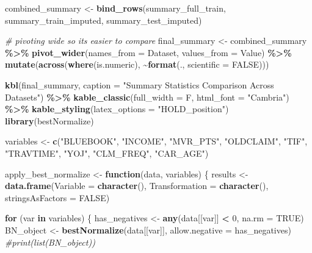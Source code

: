 \documentclass[
]{article}
\newenvironment{Shaded}{\begin{snugshade}}{\end{snugshade}}
\newcommand{\AttributeTok}[1]{\textcolor[rgb]{0.13,0.29,0.53}{#1}}
\newcommand{\CommentTok}[1]{\textcolor[rgb]{0.56,0.35,0.01}{\textit{#1}}}
\newcommand{\ConstantTok}[1]{\textcolor[rgb]{0.56,0.35,0.01}{#1}}
\newcommand{\ControlFlowTok}[1]{\textcolor[rgb]{0.13,0.29,0.53}{\textbf{#1}}}
\newcommand{\DecValTok}[1]{\textcolor[rgb]{0.00,0.00,0.81}{#1}}
\newcommand{\FunctionTok}[1]{\textcolor[rgb]{0.13,0.29,0.53}{\textbf{#1}}}
\newcommand{\NormalTok}[1]{#1}
\newcommand{\OtherTok}[1]{\textcolor[rgb]{0.56,0.35,0.01}{#1}}
\newcommand{\SpecialCharTok}[1]{\textcolor[rgb]{0.81,0.36,0.00}{\textbf{#1}}}
\newcommand{\StringTok}[1]{\textcolor[rgb]{0.31,0.60,0.02}{#1}}
\begin{document}
\begin{Shaded}
\begin{Highlighting}[]
\NormalTok{combined\_summary }\OtherTok{\textless{}{-}} \FunctionTok{bind\_rows}\NormalTok{(summary\_full\_train, summary\_train\_imputed, summary\_test\_imputed)}

\CommentTok{\# pivoting wide so it\textquotesingle{}s easier to compare}
\NormalTok{final\_summary }\OtherTok{\textless{}{-}}\NormalTok{ combined\_summary }\SpecialCharTok{\%\textgreater{}\%}
    \FunctionTok{pivot\_wider}\NormalTok{(}\AttributeTok{names\_from =}\NormalTok{ Dataset, }\AttributeTok{values\_from =}\NormalTok{ Value) }\SpecialCharTok{\%\textgreater{}\%} 
    \FunctionTok{mutate}\NormalTok{(}\FunctionTok{across}\NormalTok{(}\FunctionTok{where}\NormalTok{(is.numeric), }\SpecialCharTok{\textasciitilde{}}\FunctionTok{format}\NormalTok{(., }\AttributeTok{scientific =} \ConstantTok{FALSE}\NormalTok{)))}

\FunctionTok{kbl}\NormalTok{(final\_summary, }\AttributeTok{caption =} \StringTok{"Summary Statistics Comparison Across Datasets"}\NormalTok{) }\SpecialCharTok{\%\textgreater{}\%}
  \FunctionTok{kable\_classic}\NormalTok{(}\AttributeTok{full\_width =}\NormalTok{ F, }\AttributeTok{html\_font =} \StringTok{"Cambria"}\NormalTok{) }\SpecialCharTok{\%\textgreater{}\%}
  \FunctionTok{kable\_styling}\NormalTok{(}\AttributeTok{latex\_options =} \StringTok{"HOLD\_position"}\NormalTok{)}
\FunctionTok{library}\NormalTok{(bestNormalize)}

\NormalTok{variables }\OtherTok{\textless{}{-}} \FunctionTok{c}\NormalTok{(}\StringTok{"BLUEBOOK"}\NormalTok{, }\StringTok{"INCOME"}\NormalTok{, }\StringTok{"MVR\_PTS"}\NormalTok{, }\StringTok{"OLDCLAIM"}\NormalTok{, }\StringTok{"TIF"}\NormalTok{, }\StringTok{"TRAVTIME"}\NormalTok{, }\StringTok{"YOJ"}\NormalTok{, }\StringTok{"CLM\_FREQ"}\NormalTok{, }\StringTok{"CAR\_AGE"}\NormalTok{)}

\NormalTok{apply\_best\_normalize }\OtherTok{\textless{}{-}} \ControlFlowTok{function}\NormalTok{(data, variables) \{}
\NormalTok{  results }\OtherTok{\textless{}{-}} \FunctionTok{data.frame}\NormalTok{(}\AttributeTok{Variable =} \FunctionTok{character}\NormalTok{(), }\AttributeTok{Transformation =} \FunctionTok{character}\NormalTok{(), }\AttributeTok{stringsAsFactors =} \ConstantTok{FALSE}\NormalTok{)}
  
  \ControlFlowTok{for}\NormalTok{ (var }\ControlFlowTok{in}\NormalTok{ variables) \{}
\NormalTok{    has\_negatives }\OtherTok{\textless{}{-}} \FunctionTok{any}\NormalTok{(data[[var]] }\SpecialCharTok{\textless{}} \DecValTok{0}\NormalTok{, }\AttributeTok{na.rm =} \ConstantTok{TRUE}\NormalTok{)}
\NormalTok{    BN\_object }\OtherTok{\textless{}{-}} \FunctionTok{bestNormalize}\NormalTok{(data[[var]], }\AttributeTok{allow.negative =}\NormalTok{ has\_negatives)}
    \CommentTok{\#print(list(BN\_object))}
    

\end{Highlighting}
\end{Shaded}
\end{document}
